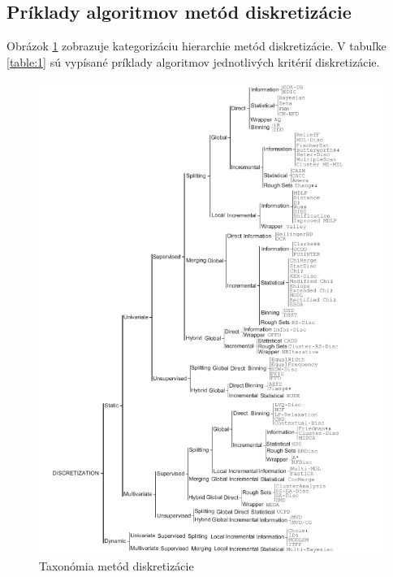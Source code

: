 \subsection{Príklady algoritmov metód diskretizácie}

 Obrázok \ref{fig:obrazok3} zobrazuje kategorizáciu hierarchie metód diskretizácie. V tabuľke \ref{table:1} sú vypísané príklady algoritmov jednotlivých kritérií diskretizácie.\cite{Garcia2013}  





\begin{figure}
	\centering
	\includegraphics[height=1.36\linewidth]{obrazky/obrazok3}
	\caption{Taxonómia metód diskretizácie\cite{Garcia2013}}
	\label{fig:obrazok3}
\end{figure}





